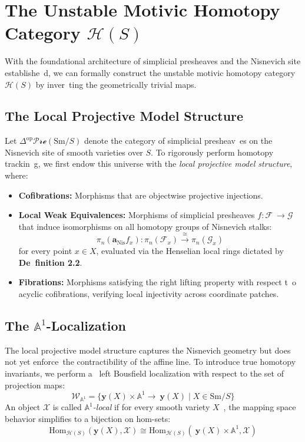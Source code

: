 \documentclass[11pt,oneside]{article}
\begin{document}
\section{The Unstable Motivic Homotopy Category \texorpdfstring{$\mathcal{H}(S)$}{H(S)}}
\label{sec:unstable_homotopy_cat}

With the foundational architecture of simplicial presheaves and the Nisnevich site establishe\
d, we can formally construct the unstable motivic homotopy category $\mathcal{H}(S)$ by inver\
ting the geometrically trivial maps.

\subsection{The Local Projective Model Structure}
Let $\Delta^{\text{op}}\mathcal{Pre}(\text{Sm}/S)$ denote the category of simplicial presheav\
es on the Nisnevich site of smooth varieties over $S$. To rigorously perform homotopy trackin\
g, we first endow this universe with the \emph{local projective model structure}, where:
\begin{itemize}
    \item \textbf{Cofibrations:} Morphisms that are objectwise projective injections.
    \item \textbf{Local Weak Equivalences:} Morphisms of simplicial presheaves $f: \mathcal{F\
} \to \mathcal{G}$ that induce isomorphisms on all homotopy groups of Nisnevich stalks:
    \[ \pi_n(\mathbf{a}_{\text{Nis}}f_x): \pi_n(\mathcal{F}_x) \xrightarrow{\cong}
\pi_n(\mathcal{G}_x) \]
    for every point $x \in X$, evaluated via the Henselian local rings dictated by \textbf{De\
finition 2.2}.
    \item \textbf{Fibrations:} Morphisms satisfying the right lifting property with respect t\
o acyclic cofibrations, verifying local injectivity across coordinate patches.
\end{itemize}

\subsection{The \texorpdfstring{$\mathbb{A}^1$}{A1}-Localization}
The local projective model structure captures the Nisnevich geometry but does not yet enforce\
 the contractibility of the affine line. To introduce true homotopy invariants, we perform a \
left Bousfield localization with respect to the set of projection maps:
\[ \mathcal{W}_{\mathbb{A}^1} = \{ \mathbf{y}(X) \times \mathbb{A}^1 \longrightarrow \mathbf{\
y}(X) \mid X \in \text{Sm}/S \} \]
An object $\mathcal{X}$ is called \emph{$\mathbb{A}^1$-local} if for every smooth variety $X$\
, the mapping space behavior simplifies to a bijection on hom-sets:
\[ \text{Hom}_{\mathcal{H}(S)}(\mathbf{y}(X), \mathcal{X}) \cong \text{Hom}_{\mathcal{H}(S)}(\
\mathbf{y}(X) \times \mathbb{A}^1, \mathcal{X}) \]
\end{document}
